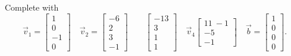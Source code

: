 \documentclass{ximera}
\begin{document}
\begin{exercise}
    Complete  with
    \begin{equation*}
        \vec{v}_1 = \begin{bmatrix} 1 \\ 0 \\ -1 \\ 0 \end{bmatrix} \quad \vec{v}_2 = \begin{bmatrix} -6 \\ 2 \\ 3 \\ -1 \end{bmatrix} \qquad \begin{bmatrix} -13 \\ 3 \\ 1 \\ 1 \end{bmatrix} \quad \vec{v}_4 \begin{bmatrix} 11 \ -1 \\ -5 \\ -1 \end{bmatrix} \quad \vec{b} = \begin{bmatrix} 1 \\ 0 \\ 0 \\ 0 \end{bmatrix}. 
    \end{equation*}
\end{exercise}
%
\end{document}
